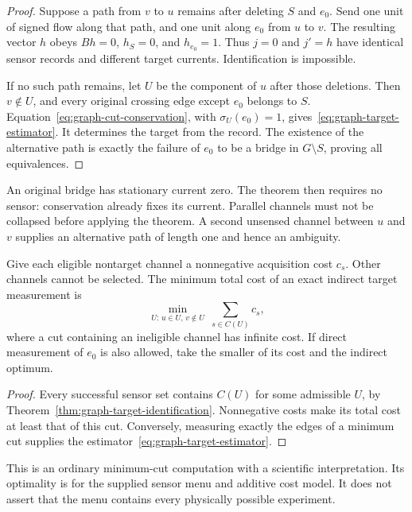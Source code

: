 \begin{proof}
Suppose a path from $v$ to $u$ remains after deleting $S$ and $e_0$. Send one
unit of signed flow along that path, and one unit along $e_0$ from $u$ to $v$.
The resulting vector $h$ obeys $Bh=0$, $h_S=0$, and $h_{e_0}=1$. Thus $j=0$
and $j'=h$ have identical sensor records and different target currents.
Identification is impossible.

If no such path remains, let $U$ be the component of $u$ after those deletions.
Then $v\notin U$, and every original crossing edge except $e_0$ belongs to
$S$. Equation~\eqref{eq:graph-cut-conservation}, with $\sigma_U(e_0)=1$,
gives~\eqref{eq:graph-target-estimator}. It determines the target from the
record. The existence of the alternative path is exactly the failure of $e_0$
to be a bridge in $G\setminus S$, proving all equivalences.
\end{proof}

An original bridge has stationary current zero. The theorem then requires no
sensor: conservation already fixes its current. Parallel channels must not be
collapsed before applying the theorem. A second unsensed channel between $u$
and $v$ supplies an alternative path of length one and hence an ambiguity.

\begin{corollary}
\label{cor:graph-minimum-cost}
Give each eligible nontarget channel a nonnegative acquisition cost $c_s$.
Other channels cannot be selected. The minimum total cost of an exact indirect
target measurement is
\begin{equation}
 \min_{U:\,u\in U,\,v\notin U}\ \sum_{s\in C(U)}c_s,
 \label{eq:graph-installation-cut}
\end{equation}
where a cut containing an ineligible channel has infinite cost. If direct
measurement of $e_0$ is also allowed, take the smaller of its cost and the
indirect optimum.
\end{corollary}

\begin{proof}
Every successful sensor set contains $C(U)$ for some admissible $U$, by
Theorem~\ref{thm:graph-target-identification}. Nonnegative costs make its
total cost at least that of this cut. Conversely, measuring exactly the edges
of a minimum cut supplies the estimator~\eqref{eq:graph-target-estimator}.
\end{proof}

This is an ordinary minimum-cut computation with a scientific interpretation.
Its optimality is for the supplied sensor menu and additive cost model. It
does not assert that the menu contains every physically possible experiment.

